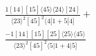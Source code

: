 \documentclass[varwidth, border=5pt]{standalone}
\begin{document}
\begin{my}
$\begin{gathered}
\scriptscriptstyle\frac{1[14][15]⟨45⟩⟨24⟩[24]}{⟨23⟩^2[45]^2⟨4|1+5|4]}+\\
\scriptscriptstyle\frac{-1[14][15][25]⟨25⟩⟨45⟩}{⟨23⟩^2[45]^2⟨5|1+4|5]}\phantom{+}
\end{gathered}$
\end{my}
\end{document}

